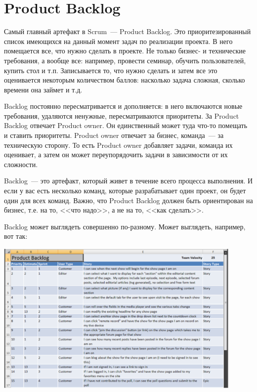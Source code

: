 \documentclass{../../text-style}
\begin{document}
\section{Product Backlog}

Самый главный артефакт в Scrum~--- Product Backlog. Это приоритезированный список имеющихся на данный момент задач по реализации проекта. В него помещается все, что нужно сделать в проекте. Не только бизнес- и технические требования, а вообще все: например, провести семинар, обучить пользователей, купить стол и т.п. Записывается то, что нужно сделать и затем все это оценивается некоторым количеством баллов: насколько задача сложная, сколько времени она займет и т.д.

Backlog постоянно пересматривается и дополняется: в него включаются новые требования, удаляются ненужные, пересматриваются приоритеты. За Product Backlog отвечает Product owner. Он единственный может туда что-то помещать и ставить приоритеты. Product owner отвечает за бизнес, команда~--- за техническую сторону. То есть Product owner добавляет задачи, команда их оценивает, а затем он может переупорядочить задачи в зависимости от их сложности.

Backlog~--- это артефакт, который живет в течение всего процесса выполнения. И если у вас есть несколько команд, которые разрабатывает один проект, он будет один для всех команд. Важно, что Product Backlog должен быть ориентирован на бизнес, т.е. на то, <<что надо>>, а не на то, <<как сделать>>.

Backlog может выглядеть совершенно по-разному. Может выглядеть, например, вот так:

\begin{center}
    \includegraphics[width=0.9\textwidth]{backlog.png}
\end{center}
\end{document}
